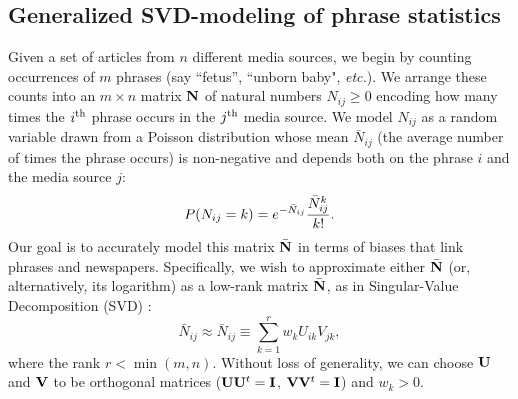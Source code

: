 \documentclass[10pt,letterpaper]{article}
\def\etc{{\frenchspacing\it etc.}}
\def\I{{\bf I}}
\def\M{{\bar\N}}
\def\Mhat{\M}
\def\N{{\bf N}}
\def\Nbar{{\bar N}}
\def\Nbarhat{{\Nbar}}
\def\U{{\bf U}}
\def\V{{\bf V}}
\def\ith{i^{\rm th}}
\def\jth{j^{\rm th}}
\def\beq#1{\begin{equation}\label{#1}}
\def\eeq{\end{equation}}
\begin{document}
\subsection*{Generalized SVD-modeling of phrase statistics}

Given a set of articles from $n$ different media sources, we begin by counting occurrences of $m$ phrases (say ``fetus'', ``unborn baby", \etc).
We arrange these counts into an 
$m\times n$ matrix $\N$ of natural numbers $N_{ij}\ge 0$ encoding
how many times the $\ith$ phrase occurs in the $\jth$ media source. 
We model $N_{ij}$ as a random variable drawn from a Poisson distribution 
whose mean $\Nbar _{ij}$ (the average number of times the phrase occurs) is non-negative and depends both on the phrase $i$ and the media source $j$:
\beq{PoissonProbEq}
P(N_{ij}=k)=e^{-\Nbar _{ij}}{\Nbar _{ij}^k\over k!}.
\eeq
Our goal is to accurately model this matrix $\M$ in terms of biases that link phrases and newspapers. Specifically, we wish to approximate either $\M$ (or, alternatively, its logarithm) as a low-rank matrix $\Mhat$, as in Singular-Value Decomposition (SVD) \cite{eckart_approximation_1936}:
$$\Nbar_{ij}\approx\Nbarhat_{ij} \equiv \sum_{k=1}^r w_k U_{ik}V_{jk},$$
where the rank $r<\min(m,n)$.
Without loss of generality, we can choose $\U$ and $\V$ to be orthogonal matrices ($\U\U^t=\I$, $\V\V^t=\I$) and $w_k>0$.
\end{document}
